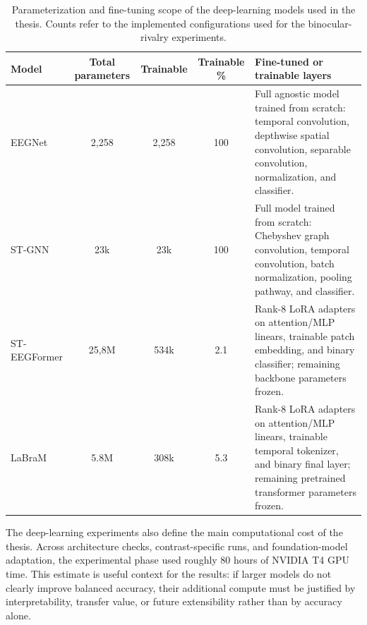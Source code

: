 \documentclass[11pt,a4paper,chapterprefix=false,parskip=false]{scrreprt}
\begin{document}
\begin{table}[H]
    \centering
    \caption{Parameterization and fine-tuning scope of the deep-learning models used in the thesis. Counts refer to the implemented configurations used for the binocular-rivalry experiments.}
    \label{tab:dl-finetuning-scope}
    \small
    \begin{tabularx}{\textwidth}{@{}lcccX@{}}
        \toprule
        Model        & Total parameters & Trainable & Trainable \% & Fine-tuned or trainable layers                                                                                                                           \\
        \midrule
        EEGNet       & 2,258            & 2,258     & 100          & Full agnostic model trained from scratch: temporal convolution, depthwise spatial convolution, separable convolution, normalization, and classifier.     \\
        ST-GNN       & 23k              & 23k       & 100          & Full model trained from scratch: Chebyshev graph convolution, temporal convolution, batch normalization, pooling pathway, and classifier.                \\
        ST-EEGFormer & 25,8M            & 534k      & 2.1          & Rank-8 LoRA adapters on attention/MLP linears, trainable patch embedding, and binary classifier; remaining backbone parameters frozen.                   \\
        LaBraM       & 5.8M             & 308k      & 5.3          & Rank-8 LoRA adapters on attention/MLP linears, trainable temporal tokenizer, and binary final layer; remaining pretrained transformer parameters frozen. \\
        \bottomrule
    \end{tabularx}
\end{table}

The deep-learning experiments also define the main computational cost of the thesis. Across architecture checks, contrast-specific runs, and foundation-model adaptation, the experimental phase used roughly 80 hours of NVIDIA T4 GPU time. This estimate is useful context for the results: if larger models do not clearly improve balanced accuracy, their additional compute must be justified by interpretability, transfer value, or future extensibility rather than by accuracy alone.
\end{document}
